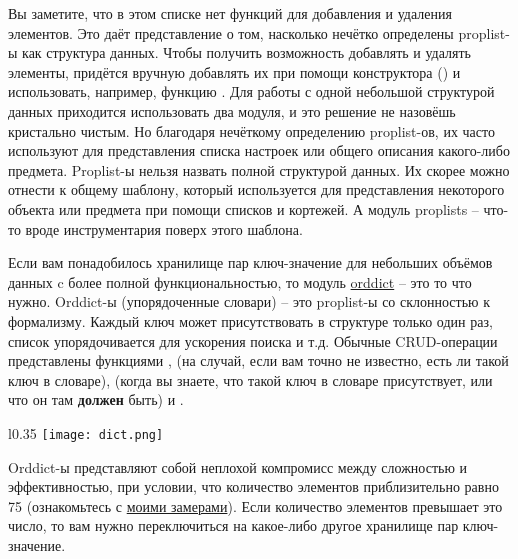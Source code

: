 Вы заметите, что в этом списке нет функций для добавления и удаления элементов.
Это даёт представление о том, насколько нечётко определены proplist\--ы как структура данных.
Чтобы получить возможность добавлять и удалять элементы, придётся вручную добавлять их при помощи конструктора () и использовать, например, функцию .
Для работы с одной небольшой структурой данных приходится использовать два модуля, и это решение не назовёшь кристально чистым.
Но благодаря нечёткому определению proplist\--ов, их часто используют для представления списка настроек или общего описания какого\--либо предмета.
Proplist\--ы нельзя назвать полной структурой данных.
Их скорее можно отнести к общему шаблону, который используется для представления некоторого объекта или предмета при помощи списков и кортежей.
А модуль proplists \--- что\--то вроде инструментария поверх этого шаблона.

Если вам понадобилось хранилище пар ключ\--значение для небольших объёмов данных c более полной функциональностью, то модуль \href{http://erldocs.com/R15B/stdlib/orddict.html}{orddict} \--- это то что нужно.
Orddict\--ы (упорядоченные словари) \--- это proplist\--ы со склонностью к формализму.
Каждый ключ может присутствовать в структуре только один раз, список упорядочивается для ускорения поиска и т.д.
Обычные CRUD\--операции представлены функциями ,  (на случай, если вам точно не известно, есть ли такой ключ в словаре),  (когда вы знаете, что такой ключ в словаре присутствует, или что он там \textbf{должен} быть) и .
\begin{wrapfigure}{l}{0.35\linewidth}
    \texttt{[image: dict.png]}
\end{wrapfigure}

Orddict\--ы представляют собой неплохой компромисс между сложностью и эффективностью, при условии, что количество элементов приблизительно равно 75 (ознакомьтесь с \href{http://learnyousomeerlang.com/static/erlang/keyval\_benchmark.erl}{моими замерами}).
Если количество элементов превышает это число, то вам нужно переключиться на какое\--либо другое хранилище пар ключ\--значение.

